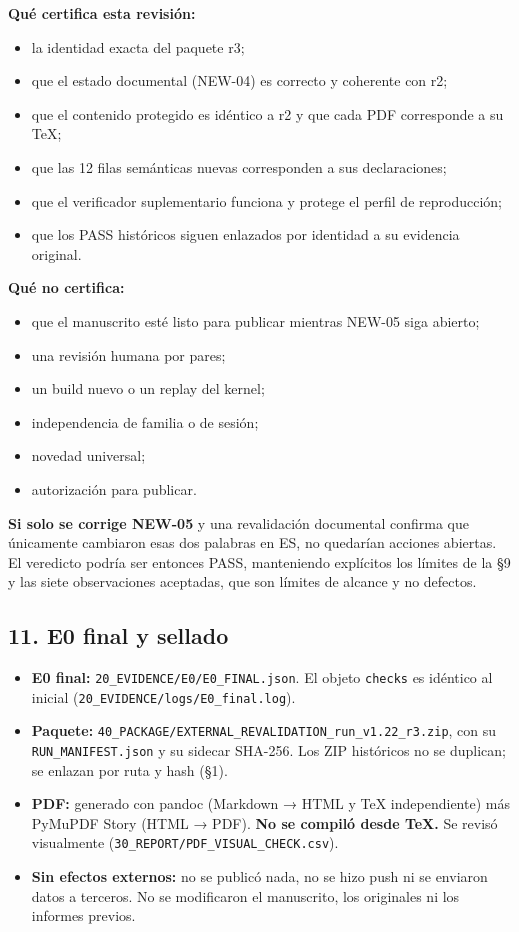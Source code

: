 \documentclass[
]{article}
\providecommand{\tightlist}{%
  \setlength{\itemsep}{0pt}\setlength{\parskip}{0pt}}
\begin{document}
\textbf{Qué certifica esta revisión:}

\begin{itemize}
\tightlist
\item
  la identidad exacta del paquete r3;
\item
  que el estado documental (NEW-04) es correcto y coherente con r2;
\item
  que el contenido protegido es idéntico a r2 y que cada PDF corresponde
  a su TeX;
\item
  que las 12 filas semánticas nuevas corresponden a sus declaraciones;
\item
  que el verificador suplementario funciona y protege el perfil de
  reproducción;
\item
  que los PASS históricos siguen enlazados por identidad a su evidencia
  original.
\end{itemize}

\textbf{Qué no certifica:}

\begin{itemize}
\tightlist
\item
  que el manuscrito esté listo para publicar mientras NEW-05 siga
  abierto;
\item
  una revisión humana por pares;
\item
  un build nuevo o un replay del kernel;
\item
  independencia de familia o de sesión;
\item
  novedad universal;
\item
  autorización para publicar.
\end{itemize}

\textbf{Si solo se corrige NEW-05} y una revalidación documental
confirma que únicamente cambiaron esas dos palabras en ES, no quedarían
acciones abiertas. El veredicto podría ser entonces PASS, manteniendo
explícitos los límites de la §9 y las siete observaciones aceptadas, que
son límites de alcance y no defectos.

\subsection{11. E0 final y sellado}\label{11-e0-final-y-sellado}

\begin{itemize}
\tightlist
\item
  \textbf{E0 final:} \texttt{20\_EVIDENCE/E0/E0\_FINAL.json}. El objeto
  \texttt{checks} es idéntico al inicial
  (\texttt{20\_EVIDENCE/logs/E0\_final.log}).
\item
  \textbf{Paquete:}
  \texttt{40\_PACKAGE/EXTERNAL\_REVALIDATION\_run\_v1.22\_r3.zip}, con
  su \texttt{RUN\_MANIFEST.json} y su sidecar SHA-256. Los ZIP
  históricos no se duplican; se enlazan por ruta y hash (§1).
\item
  \textbf{PDF:} generado con pandoc (Markdown → HTML y TeX
  independiente) más PyMuPDF Story (HTML → PDF). \textbf{No se compiló
  desde TeX.} Se revisó visualmente
  (\texttt{30\_REPORT/PDF\_VISUAL\_CHECK.csv}).
\item
  \textbf{Sin efectos externos:} no se publicó nada, no se hizo push ni
  se enviaron datos a terceros. No se modificaron el manuscrito, los
  originales ni los informes previos.
\end{itemize}
\end{document}
